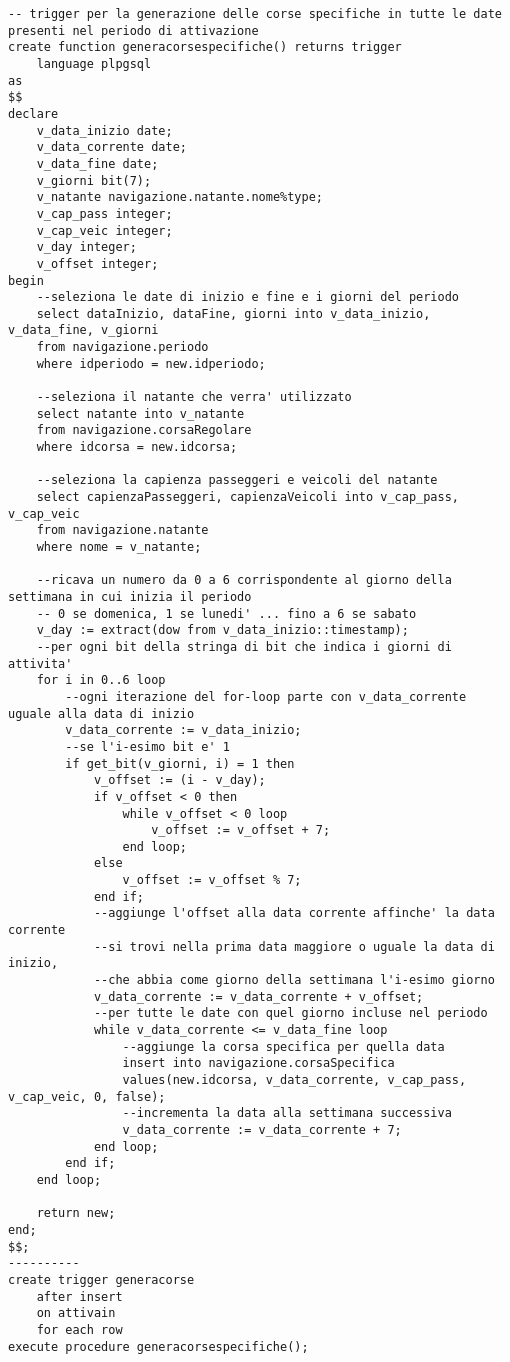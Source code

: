 \begin{lstlisting}[style=sqlstyle]
-- trigger per la generazione delle corse specifiche in tutte le date presenti nel periodo di attivazione
create function generacorsespecifiche() returns trigger
    language plpgsql
as
$$
declare
    v_data_inizio date;
    v_data_corrente date;
    v_data_fine date;
    v_giorni bit(7);
    v_natante navigazione.natante.nome%type;
    v_cap_pass integer;
    v_cap_veic integer;
    v_day integer;
    v_offset integer;
begin
    --seleziona le date di inizio e fine e i giorni del periodo
    select dataInizio, dataFine, giorni into v_data_inizio, v_data_fine, v_giorni
    from navigazione.periodo
    where idperiodo = new.idperiodo;

    --seleziona il natante che verra' utilizzato
    select natante into v_natante
    from navigazione.corsaRegolare
    where idcorsa = new.idcorsa;

    --seleziona la capienza passeggeri e veicoli del natante
    select capienzaPasseggeri, capienzaVeicoli into v_cap_pass, v_cap_veic
    from navigazione.natante
    where nome = v_natante;

    --ricava un numero da 0 a 6 corrispondente al giorno della settimana in cui inizia il periodo
    -- 0 se domenica, 1 se lunedi' ... fino a 6 se sabato
    v_day := extract(dow from v_data_inizio::timestamp);
    --per ogni bit della stringa di bit che indica i giorni di attivita'
    for i in 0..6 loop
        --ogni iterazione del for-loop parte con v_data_corrente uguale alla data di inizio
        v_data_corrente := v_data_inizio;
        --se l'i-esimo bit e' 1
        if get_bit(v_giorni, i) = 1 then
            v_offset := (i - v_day);
            if v_offset < 0 then
                while v_offset < 0 loop
                    v_offset := v_offset + 7;
                end loop;
            else
                v_offset := v_offset % 7;
            end if;
            --aggiunge l'offset alla data corrente affinche' la data corrente
            --si trovi nella prima data maggiore o uguale la data di inizio,
            --che abbia come giorno della settimana l'i-esimo giorno
            v_data_corrente := v_data_corrente + v_offset;
            --per tutte le date con quel giorno incluse nel periodo
            while v_data_corrente <= v_data_fine loop
                --aggiunge la corsa specifica per quella data
                insert into navigazione.corsaSpecifica
                values(new.idcorsa, v_data_corrente, v_cap_pass, v_cap_veic, 0, false);
                --incrementa la data alla settimana successiva
                v_data_corrente := v_data_corrente + 7;
            end loop;
        end if;
    end loop;
    
    return new;
end;
$$;
----------
create trigger generacorse
    after insert
    on attivain
    for each row
execute procedure generacorsespecifiche();

\end{lstlisting}

